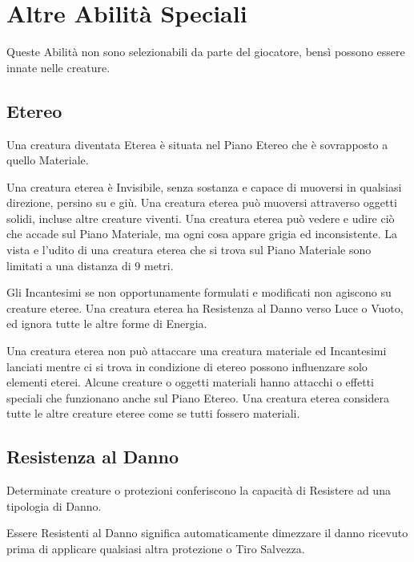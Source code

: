 \section{Altre Abilità Speciali}


\begin{multicols}{2}

Queste Abilità non sono selezionabili da parte del giocatore, bensì possono essere innate nelle creature.

\subsection{Etereo}\label{etereo}

Una creatura diventata Eterea è situata nel Piano Etereo che è sovrapposto a quello Materiale.

Una creatura eterea è Invisibile, senza sostanza e capace di muoversi in qualsiasi direzione, persino su e giù. Una creatura eterea può muoversi attraverso oggetti solidi, incluse altre creature viventi. Una creatura eterea può vedere e udire ciò che accade sul Piano Materiale, ma ogni cosa appare grigia ed inconsistente. La vista e l'udito di una creatura eterea che si trova sul Piano Materiale sono limitati a una distanza di 9 metri.

Gli Incantesimi se non opportunamente formulati e modificati non agiscono su creature eteree. Una creatura eterea ha Resistenza al Danno verso Luce o Vuoto, ed ignora tutte le altre forme di Energia.

Una creatura eterea non può attaccare una creatura materiale ed Incantesimi lanciati mentre ci si trova in condizione di etereo possono influenzare solo elementi eterei. Alcune creature o oggetti materiali hanno attacchi o effetti speciali che funzionano anche sul Piano Etereo. Una creatura eterea considera tutte le altre creature eteree come se tutti fossero materiali.

\subsection{Resistenza al Danno}\label{resistenzaaldanno}

Determinate creature o protezioni conferiscono la capacità di Resistere ad una tipologia di Danno.

Essere Resistenti al Danno significa automaticamente dimezzare il danno ricevuto prima di applicare qualsiasi altra protezione o Tiro Salvezza.


\end{multicols}
